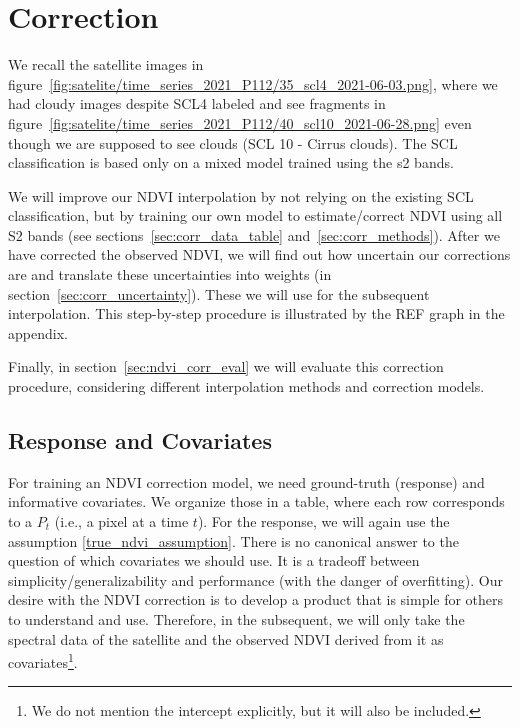 \section{Correction}{
    \label{sec:corr_correction}
    {
        We recall the satellite images in figure~\ref{fig:satelite/time_series_2021_P112/35_scl4_2021-06-03.png}, where we had cloudy images despite SCL4 labeled and see fragments in figure~\ref{fig:satelite/time_series_2021_P112/40_scl10_2021-06-28.png} even though we are supposed to see clouds (SCL 10 - Cirrus clouds). The SCL classification is based only on a mixed model trained using the s2 bands. 
        
        We will improve our NDVI interpolation by not relying on the existing SCL classification, but by training our own model to estimate/correct NDVI using all S2 bands (see sections~\ref{sec:corr_data_table} and~\ref{sec:corr_methods}). After we have corrected the observed NDVI, we will find out how uncertain our corrections are and translate these uncertainties into weights (in section~\ref{sec:corr_uncertainty}). These we will use for the subsequent interpolation. This step-by-step procedure is illustrated by the REF graph in the appendix.

        Finally, in section~\ref{sec:ndvi_corr_eval} we will evaluate this correction procedure, considering different interpolation methods and correction models.
    }

    \subsection{Response and Covariates}{
        \label{sec:corr_data_table}

        For training an NDVI correction model, we need ground-truth (response) and informative covariates. We organize those in a table, where each row corresponds to a $P_t$ (i.e., a pixel at a time $t$). 
        For the response, we will again use the assumption \ref{true_ndvi_assumption}. There is no canonical answer to the question of which covariates we should use. It is a tradeoff between simplicity/generalizability and performance (with the danger of overfitting). 
        Our desire with the NDVI correction is to develop a product that is simple for others to understand and use. Therefore, in the subsequent, we will only take the spectral data of the satellite and the observed NDVI derived from it as covariates\footnote{We do not mention the intercept explicitly, but it will also be included.}.  
    }    

}
